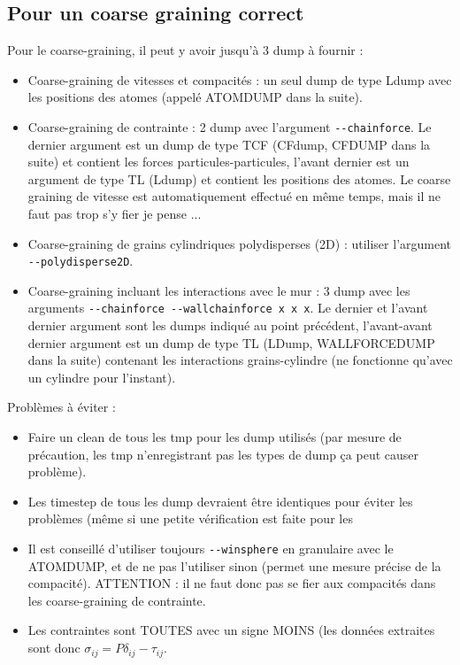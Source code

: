 \documentclass[a4paper,12pt]{article}
\begin{document}
{{{\subsection{Pour un coarse graining correct}
Pour le coarse-graining, il peut y avoir jusqu'\`a 3 dump \`a fournir :
\begin{itemize}
\item Coarse-graining de vitesses et compacit\'es : un seul dump de type Ldump avec les positions des atomes (appel\'e ATOMDUMP dans la suite).
\item Coarse-graining de contrainte : 2 dump avec l'argument \verb{--chainforce{. Le dernier argument est un dump de type TCF (CFdump, CFDUMP dans la suite) et contient les forces particules-particules, l'avant dernier est un argument de type TL (Ldump) et contient les positions des atomes. Le coarse graining de vitesse est automatiquement effectu\'e en m\^eme temps, mais il ne faut pas trop s'y fier je pense ...
\item Coarse-graining de grains cylindriques polydisperses (2D) : utiliser l'argument \verb{--polydisperse2D{.
\item Coarse-graining incluant les interactions avec le mur : 3 dump avec les arguments \verb{--chainforce --wallchainforce x x x{. Le dernier et l'avant dernier argument sont les dumps indiqu\'e au point pr\'ec\'edent, l'avant-avant dernier argument est un dump de type TL (LDump, WALLFORCEDUMP dans la suite) contenant les interactions grains-cylindre (ne fonctionne qu'avec un cylindre pour l'instant). 
\end{itemize}
\bigskip 
Probl\`emes \`a \'eviter : 
\begin{itemize}
\item Faire un clean de tous les tmp pour les dump utilis\'es (par mesure de pr\'ecaution, les tmp n'enregistrant pas les types de dump \c ca peut causer probl\`eme).
\item Les timestep de tous les dump devraient \^etre identiques pour \'eviter les probl\`emes (m\^eme si une petite v\'erification est faite pour les 
\item Il est conseill\'e d'utiliser toujours \verb{--winsphere{ en granulaire avec le ATOMDUMP, et de ne pas l'utiliser sinon (permet une mesure pr\'ecise de la compacit\'e). ATTENTION : il ne faut donc pas se fier aux compacit\'es dans les coarse-graining de contrainte.
\item Les contraintes sont TOUTES avec un signe MOINS (les donn\'ees extraites sont donc $\sigma_{ij}=P\delta_{ij} - \tau_{ij}$.
\end{itemize}

}}}
\end{document}
